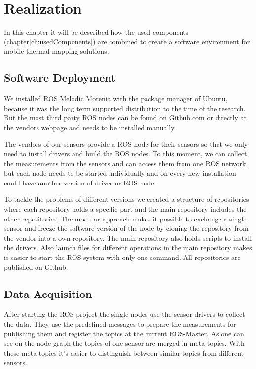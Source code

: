\chapter{Realization}\label{ch:realization}

In this chapter it will be described how the used components (chapter\ref{ch:usedComponents}) are combined to create a software environment for mobile thermal mapping solutions.

\section{Software Deployment}\label{ch:realization:sec:softwareDeployment}

We installed \ac{ROS} Melodic Morenia with the package manager of Ubuntu, because it was the long term supported distribution to the time of the research.
But the most third party \ac{ROS} nodes can be found on \href{https://github.com}{Github.com} or directly at the vendors webpage and needs to be installed manually.

The vendors of our sensors provide a \ac{ROS} node for their sensors so that we only need to install drivers and build the \ac{ROS} nodes.
To this moment, we can collect the measurements from the sensors and can access them from one \ac{ROS} network but each node needs to be started individually and on every new installation could have another version of driver or \ac{ROS} node.

To tackle the problems of different versions we created a structure of repositories where each repository holds a specific part and the main repository includes the other repositories.
The modular approach makes it possible to exchange a single sensor and freeze the software version of the node by cloning the repository from the vendor into a own repository.
The main repository also holds scripts to install the drivers.
Also launch files for different operations in the main repository makes is easier to start the ROS system with only one command.
All repositories are published on Github. 

\section{Data Acquisition}\label{ch:realization:sec:dataAcquisition}

After starting the \ac{ROS} project the single nodes use the sensor drivers to collect the data.
They use the predefined messages to prepare the measurements for publishing them and register the topics at the current ROS-Master. 
As one can see on the node graph the topics of one sensor are merged in meta topics.
With these meta topics it's easier to distinguish between similar topics from different sensors. 

